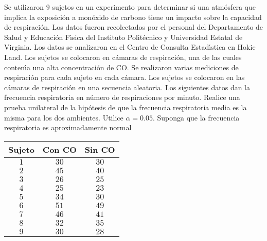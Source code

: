 \begin{enunciado}
 Se utilizaron $9$ sujetos en un experimento para determinar si una atm\'osfera que implica la exposici\'on a mon\'oxido de carbono tiene un impacto sobre la capacidad de respiraci\'on. Los datos fueron recolectados por el personal del Departamento de Salud y Educaci\'on F\'{\i}sica del Instituto Polit\'ecnico y Universidad Estatal de Virginia. Los datos se analizaron en el Centro de Consulta Estad\'{\i}stica en Hokie Land. Los sujetos se colocaron en c\'amaras de respiraci\'on, una de las cuales conten\'{\i}a una alta concentraci\'on de CO. Se realizaron varias mediciones de respiraci\'on para cada sujeto en cada c\'amara. Los sujetos se colocaron en las c\'amaras de respiraci\'on en una secuencia aleatoria. Los siguientes datos dan la frecuencia respiratoria en n\'umero de respiraciones por minuto. Realice una prueba unilateral de la hip\'otesis de que la frecuencia respiratoria media es la misma para los dos ambientes. Utilice $\alpha = 0.05$. Suponga que la frecuencia respiratoria es aproximadamente normal
 \begin{center}
  \begin{tabular}{ccc}
   \textbf{Sujeto} & \textbf{Con CO} & \textbf{Sin CO} \\
   \hline 
   $1$ & $30$ & $30$ \\
   $2$ & $45$ & $40$ \\
   $3$ & $26$ & $25$ \\
   $4$ & $25$ & $23$ \\
   $5$ & $34$ & $30$ \\
   $6$ & $51$ & $49$ \\
   $7$ & $46$ & $41$ \\
   $8$ & $32$ & $35$ \\
   $9$ & $30$ & $28$
  \end{tabular}
 \end{center}
\end{enunciado}

